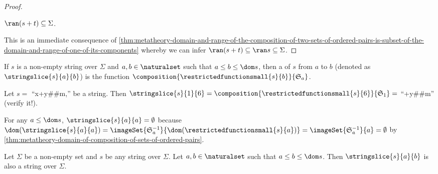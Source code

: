 \begin{proof}
    \begin{claim}
         \label{claim:range-of-s-concatenant-t-is-subset-of-Sigma}
        \( \ran \mleft( s + t \mright) \subseteq \Sigma \).
    \end{claim}
    \noindent
    This is an immediate consequence of \cref{thm:metatheory-domain-and-range-of-the-composition-of-two-sets-of-ordered-pairs-is-subset-of-the-domain-and-range-of-one-of-its-components} whereby we can infer \( \ran \mleft( s + t \mright) \subseteq \ran s \subseteq \Sigma \).
\end{proof}

\begin{dfn}[Slice]
     \label{dfn:metatheory-string-slice}
    If \( s \) is a non-empty string over \( \Sigma \) and \( a, b \in \naturalset \) such that \( a \leq b \leq \dom s \),
    then a  of \( s \) from \( a \) to \( b \) (denoted as \( \stringslice{s}{a}{b} \)) is the function
    \( \composition{\restrictedfunctionsmall{s}{b}}{ \mathfrak{S}_{a} } \).
\end{dfn}

\begin{eg}
    Let \( s = \) ``x+y\#\#m,'' be a string.
    Then \( \stringslice{s}{1}{6} = \composition{\restrictedfunctionsmall{s}{6}}{ \mathfrak{S}_{1} } =  \) ``+y\#\#m'' (verify it!).
\end{eg}

\begin{cor}
     \label{cor:metatheory-string-slice-equal-start-and-end}
    For any \( a \leq \dom s \), \( \stringslice{s}{a}{a} = \emptyset \) because
    \( \dom \mleft( \stringslice{s}{a}{a} \mright) = \imageSet{\mathfrak{S}^{-1}_{a}}{\dom \mleft( \restrictedfunctionsmall{s}{a} \mright)} = \imageSet{\mathfrak{S}^{-1}_{a}}{a} = \emptyset \)
    by \cref{thm:metatheory-domain-of-composition-of-sets-of-ordered-pairs}.
\end{cor}

\begin{thm}
     \label{thm:metatheory-any-slice-of-a-string-is-also-a-string}
    Let \( \Sigma \) be a non-empty set and \( s \) be any string over \( \Sigma \).
    Let \( a, b \in \naturalset \) such that \( a \leq b \leq \dom s \).
    Then \( \stringslice{s}{a}{b} \) is also a string over \( \Sigma \).
\end{thm}

